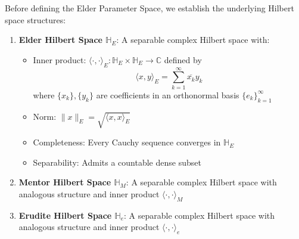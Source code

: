 \begin{definition}
\label{def:hilbert_space_structure}
Before defining the Elder Parameter Space, we establish the underlying Hilbert space structures:

\begin{enumerate}
\item \textbf{Elder Hilbert Space $\mathbb{H}_E$}: A separable complex Hilbert space with:
   \begin{itemize}
   \item Inner product: $\langle \cdot, \cdot \rangle_E: \mathbb{H}_E \times \mathbb{H}_E \rightarrow \mathbb{C}$ defined by
   $$\langle x, y \rangle_E = \sum_{k=1}^{\infty} \overline{x_k} y_k$$
   where $\{x_k\}, \{y_k\}$ are coefficients in an orthonormal basis $\{e_k\}_{k=1}^{\infty}$
   \item Norm: $\|x\|_E = \sqrt{\langle x, x \rangle_E}$
   \item Completeness: Every Cauchy sequence converges in $\mathbb{H}_E$
   \item Separability: Admits a countable dense subset
   \end{itemize}

\item \textbf{Mentor Hilbert Space $\mathbb{H}_M$}: A separable complex Hilbert space with analogous structure and inner product $\langle \cdot, \cdot \rangle_M$

\item \textbf{Erudite Hilbert Space $\mathbb{H}_e$}: A separable complex Hilbert space with analogous structure and inner product $\langle \cdot, \cdot \rangle_e$
\end{enumerate}
\end{definition}


